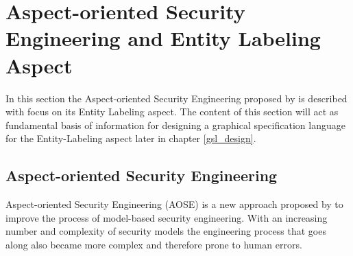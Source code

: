 \documentclass[twoside, openright, 12pt]{book}
\begin{document}







\section{Aspect-oriented Security Engineering and Entity Labeling Aspect}
\label{AOSEEL}
In this section the Aspect-oriented Security Engineering proposed by \cite{Amthor18} is described with focus on its Entity Labeling aspect.
The content of this section will act as fundamental basis of information for designing a graphical specification language for the Entity-Labeling aspect later in chapter \ref{gsl_design}.


\subsection{Aspect-oriented Security Engineering}
\label{AOSE}
Aspect-oriented Security Engineering (AOSE) is a new approach proposed by \cite{Amthor18} to improve the process of model-based security engineering.
With an increasing number and complexity of security models the engineering process that goes along also became more complex and therefore prone to human errors.
\end{document}
